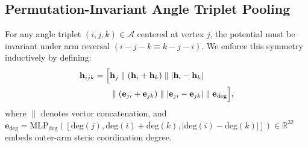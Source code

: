 \documentclass[11pt,a4paper]{article}
\begin{document}
\subsection{Permutation-Invariant Angle Triplet Pooling}
For any angle triplet $(i, j, k) \in \mathcal{A}$ centered at vertex $j$, the potential must be invariant under arm reversal $(i-j-k \equiv k-j-i)$. We enforce this symmetry inductively by defining:
\begin{align}
\mathbf{h}_{ijk} = \Big[ &\mathbf{h}_j \parallel (\mathbf{h}_i + \mathbf{h}_k) \parallel |\mathbf{h}_i - \mathbf{h}_k| \notag \\
&\parallel (\mathbf{e}_{ji} + \mathbf{e}_{jk}) \parallel |\mathbf{e}_{ji} - \mathbf{e}_{jk}| \parallel \mathbf{e}_{\text{deg}} \Big],
\label{eq:triplet}
\end{align}
where $\parallel$ denotes vector concatenation, and $\mathbf{e}_{\text{deg}} = \text{MLP}_{\text{deg}}([\text{deg}(j), \text{deg}(i)+\text{deg}(k), |\text{deg}(i)-\text{deg}(k)|]) \in \mathbb{R}^{32}$ embeds outer-arm steric coordination degree.
\end{document}
